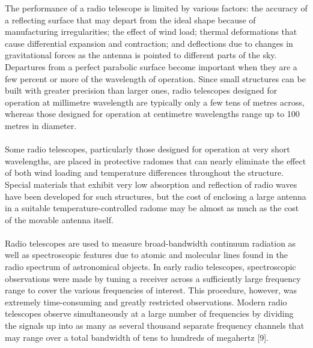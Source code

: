 \documentclass[a4paper,12pt]{report}
\begin{document}
The performance of a radio telescope is limited by various factors: the accuracy of a reflecting surface that may depart from the ideal shape because of manufacturing irregularities; the effect of wind load; thermal deformations that cause differential expansion and contraction; and deflections due to changes in gravitational forces as the antenna is pointed to different parts of the sky. Departures from a perfect parabolic surface become important when they are a few percent or more of the wavelength of operation. Since small structures can be built with greater precision than larger ones, radio telescopes designed for operation at millimetre wavelength are typically only a few tens of metres across, whereas those designed for operation at centimetre wavelengths range up to 100 metres in diameter.\\\\
Some radio telescopes, particularly those designed for operation at very short wavelengths, are placed in protective radomes that can nearly eliminate the effect of both wind loading and temperature differences throughout the structure. Special materials that exhibit very low absorption and reflection of radio waves have been developed for such structures, but the cost of enclosing a large antenna in a suitable temperature-controlled radome may be almost as much as the cost of the movable antenna itself.\\\\
Radio telescopes are used to measure broad-bandwidth continuum radiation as well as spectroscopic features due to atomic and molecular lines found in the radio spectrum of astronomical objects. In early radio telescopes, spectroscopic observations were made by tuning a receiver across a sufficiently large frequency range to cover the various frequencies of interest. This procedure, however, was extremely time-consuming and greatly restricted observations. Modern radio telescopes observe simultaneously at a large number of frequencies by dividing the signals up into as many as several thousand separate frequency channels that may range over a total bandwidth of tens to hundreds of megahertz [9].
\end{document}

